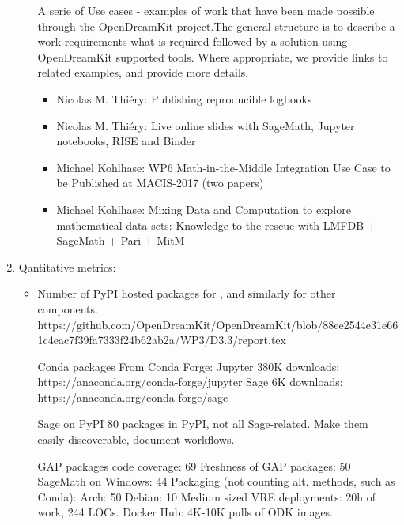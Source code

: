 \begin{enumerate}
\begin{itemize}
A serie of Use cases - examples of work that have been made possible through the OpenDreamKit project.The general structure is to 
describe a work requirements what is required followed by a solution using OpenDreamKit supported tools. Where appropriate, we provide links 
to related examples, and provide more details.  
\begin{itemize}     
4 use cases: %
\item Nicolas M. Thiéry: Publishing reproducible logbooks 
\item Nicolas M. Thiéry: Live online slides with SageMath, Jupyter notebooks, RISE and Binder
\item Michael Kohlhase: WP6 Math-in-the-Middle Integration Use Case to be Published at MACIS-2017 (two papers) 
\item Michael Kohlhase: Mixing Data and Computation to explore mathematical data sets: Knowledge to the rescue with LMFDB + SageMath + Pari + MitM 
\end{itemize}        
\end{itemize} 
\item Qantitative metrics:
    \begin{itemize}
    \item Number of PyPI hosted packages for \Sage, and similarly for other components.
     https://github.com/OpenDreamKit/OpenDreamKit/blob/88ee2544e31e661c4eac7f39fa7333f24b62ab2a/WP3/D3.3/report.tex
  
  Conda packages
      From Conda Forge:
      Jupyter 380K downloads: https://anaconda.org/conda-forge/jupyter
      Sage 6K downloads: https://anaconda.org/conda-forge/sage

      Sage on PyPI
      80 packages in PyPI, not all Sage-related.
      Make them easily discoverable, document workflows.


    GAP packages code coverage: 69%
    Freshness of GAP packages: 50%
    SageMath on Windows: 44%
    Packaging (not counting alt. methods, such as Conda):
    Arch: 50%
    Debian: 10%
    Medium sized VRE deployments: 20h of work, 244 LOCs.
    Docker Hub: 4K-10K pulls of ODK images.
    


\end{itemize}
\end{enumerate}
